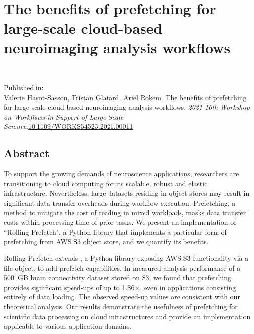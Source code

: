 \chapter{The benefits of prefetching for large-scale cloud-based neuroimaging
analysis workflows}~\label{chp:rp}




\noindent
Published in: \\
Valerie Hayot-Sasson, Tristan Glatard, Ariel Rokem. The benefits of prefetching for large-scale cloud-based neuroimaging
analysis workflows. \textit{2021 16th Workshop on Workflows in Support of Large-Scale Science}.\url{10.1109/WORKS54523.2021.00011} \\
\section{Abstract}
To support the growing demands of neuroscience applications, researchers are
transitioning to cloud computing for its scalable, robust and elastic
infrastructure. Nevertheless, large datasets residing in object stores may
result in significant data transfer overheads during workflow execution.
Prefetching, a method to mitigate the cost of reading in mixed workloads, masks
data transfer costs within processing time of prior tasks. We present an
implementation of ``Rolling Prefetch", a Python library that implements a
particular form of prefetching from AWS S3 object store, and we quantify its
benefits.

Rolling Prefetch extends \sfs, a Python library exposing AWS S3 functionality
via a file object, to add prefetch capabilities. In measured analysis
performance of a 500~GB brain connectivity dataset stored on S3, we found that
prefetching provides significant speed-ups of up to 1.86$\times$, even in
applications consisting entirely of data loading. The observed speed-up values
are consistent with our theoretical analysis. Our results demonstrate the
usefulness of prefetching for scientific data processing on cloud
infrastructures and provide an implementation applicable to various application
domains.


